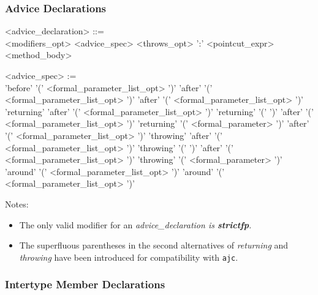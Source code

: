 \subsubsection{Advice Declarations}

\begin{minipage}{6in}
\begin{grammar}
<advice_declaration> ::= \hspace{1in} \\
      {\red <modifiers_opt>} <advice_spec> {\red <throws_opt>} ':'
      {\blue <pointcut_expr>} {\red <method_body>}

<advice_spec> :=  \hspace{1in} \\
       'before' '(' {\red <formal_parameter_list_opt>} ')'
\alt   'after'  '(' {\red <formal_parameter_list_opt>} ')'
\alt   'after'  '(' {\red <formal_parameter_list_opt>} ')' 'returning'
\alt   'after'  '(' {\red <formal_parameter_list_opt>} ')' 'returning' '(' ')'
\alt   'after'  '(' {\red <formal_parameter_list_opt>} ')' 'returning'
             '(' {\red <formal_parameter>} ')'
\alt   'after'  '(' {\red <formal_parameter_list_opt>} ')' 'throwing'
\alt   'after'  '(' {\red <formal_parameter_list_opt>} ')' 'throwing' '(' ')'
\alt   'after'  '(' {\red <formal_parameter_list_opt>} ')' 'throwing'
             '(' {\red <formal_parameter>} ')'
 'around' '(' {\red <formal_parameter_list_opt>} ')'
 'around' '(' {\red <formal_parameter_list_opt>} ')'
\end{grammar}
\end{minipage}

\noindent Notes:
\begin{itemize}
\item The only valid modifier for an \em{advice\_declaration} is 
{\bf strictfp}.
\item The superfluous parentheses in the second alternatives of
{\it returning} and {\it throwing} have been introduced for compatibility with {\tt ajc}. 
\end{itemize}

\subsubsection{Intertype Member Declarations}

